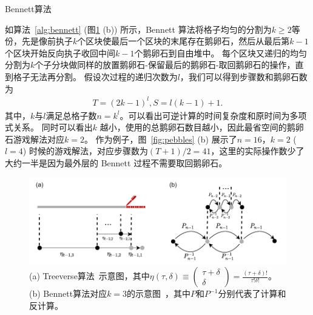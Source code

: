\documentclass[A4,twoside,UTF8]{ctexart}
\begin{document}
\begin{algorithm}
    \SetAlgoLined
    \DontPrintSemicolon
    \caption{Bennett算法}\label{alg:bennett}
\end{algorithm}
如算法~\ref{alg:bennett} (图\ref{fig:tradeoff} (b)) 所示，Bennett 算法将格子均匀的分割为$k\geq 2$等份，先是像前执子$k$个区块使最后一个区块的末尾存在鹅卵石，然后从最后第$k-1$个区块开始反向执子收回中间$k-1$个鹅卵石到自由堆中。
每个区块又递归的均匀分割为$k$个子分块做同样的放置鹅卵石-保留最后的鹅卵石-取回鹅卵石的操作，直到格子无法再分割。
假设次过程的递归次数为$l$，我们可以得到步骤数和鹅卵石数为
\begin{align}\label{eq:rev}
    T = (2k-1)^l, S = l(k-1)+1.
\end{align}
其中，$k$与$l$满足总格子数$n = k^l$。可以看出可逆计算的时间复杂度和原时间为多项式关系。
同时可以看出$k$ 越小，使用的总鹅卵石数目越小，因此最省空间的鹅卵石游戏解法对应$k=2$。
作为例子，图~\ref{fig:pebbles} (b) 展示了$n=16$，$k=2$ ($l=4$) 时候的游戏解法，对应步骤数为$(T+1)/2 = 41$，这里的实际操作数少了大约一半是因为最外层的 Bennett 过程不需要取回鹅卵石。

\begin{figure}
    \centerline{\includegraphics[width=0.88\columnwidth,trim={0 0cm 0 0cm},clip]{tradeoff2.pdf}}
    \caption{(a) Treeverse算法~\cite{Griewank1992}示意图，其中$\eta(\tau, \delta) \equiv \left(\begin{matrix} \tau + \delta \\ \delta \end{matrix}\right)=\frac{(\tau+\delta)!}{\tau!\delta!}$。(b) Bennett算法对应$k=3$的示意图~\cite{Bennett1973,Levine1990}，其中$P$和$P^{-1}$分别代表了计算和反计算。}\label{fig:tradeoff}
\end{figure}
\end{document}
